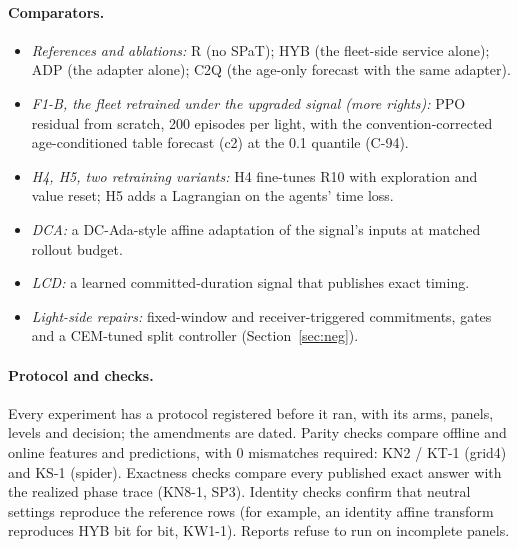 \documentclass[11pt]{article}
\begin{document}
\paragraph{Comparators.}
\begin{itemize}\setlength\itemsep{0pt}
\item \emph{References and ablations:} R (no SPaT); HYB (the fleet-side service alone); ADP (the adapter alone); C2Q (the age-only forecast
with the same adapter).
\item \emph{F1-B, the fleet retrained under the upgraded signal (more rights):} PPO residual from scratch, 200 episodes per light, with the
convention-corrected age-conditioned table forecast (c2) at the 0.1 quantile (C-94).
\item \emph{H4, H5, two retraining variants:} H4 fine-tunes R10 with exploration and value reset; H5 adds a Lagrangian on the agents' time
loss.
\item \emph{DCA:} a DC-Ada-style affine adaptation of the signal's inputs at matched rollout budget.
\item \emph{LCD:} a learned committed-duration signal that publishes exact timing.
\item \emph{Light-side repairs:} fixed-window and receiver-triggered commitments, gates and a CEM-tuned split controller (Section~\ref{sec:neg}).
\end{itemize}
\paragraph{Protocol and checks.} Every experiment has a protocol registered before it ran, with its arms, panels, levels and decision; the
amendments are dated. Parity checks compare offline and online features and predictions, with 0 mismatches required:
KN2 / KT-1 (grid4) and KS-1 (spider). Exactness checks compare every published exact answer with the realized phase trace (KN8-1, SP3).
Identity checks confirm that neutral settings reproduce the reference rows (for example, an identity affine transform reproduces HYB
bit for bit, KW1-1). Reports refuse to run on incomplete panels.
\end{document}
